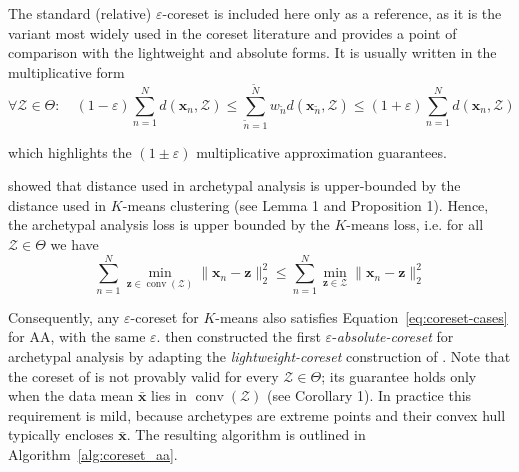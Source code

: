 \documentclass{article}
\begin{document}
The standard (relative) $\varepsilon$-coreset is included here only as a reference, as it is the variant most widely used in the coreset literature and provides a point of comparison with the lightweight and absolute forms.  It is usually written in the multiplicative form
\begin{equation}
    \forall \mathcal{Z} \in \Theta: \quad (1-\varepsilon) \sum_{n=1}^N d(\mathbf{x}_n, \mathcal{Z}) \leq \sum_{\tilde{n}=1}^{\tilde{N}} w_{\tilde{n}} d(\mathbf{x}_{\tilde{n}}, \mathcal{Z}) \leq (1+\varepsilon)  \sum_{n=1}^N d(\mathbf{x}_n, \mathcal{Z})
\end{equation}

which highlights the $(1 \pm \varepsilon)$ multiplicative approximation guarantees.

\textcite{mairCoresetsArchetypalAnalysis2019} showed that distance used in archetypal analysis is upper-bounded by the distance used in $K$-means clustering (see Lemma 1 and Proposition 1). Hence, the archetypal analysis loss is upper bounded by the $K$-means loss, i.e. for all $\mathcal{Z} \in \Theta$ we have
\begin{equation}
    \sum_{n=1}^N \min_{\mathbf{z} \in \operatorname{conv}(\mathcal{Z})} \| \mathbf{x}_n - \mathbf{z} \|_2^2 \leq
    \sum_{n=1}^N \min_{\mathbf{z} \in \mathcal{Z}} \| \mathbf{x}_n - \mathbf{z} \|_2^2
\end{equation}

Consequently, any $\varepsilon$-coreset for $K$-means also satisfies Equation~\ref{eq:coreset-cases} for AA, with the same $\varepsilon$. \textcite{mairCoresetsArchetypalAnalysis2019} then constructed the first $\varepsilon$-\emph{absolute-coreset} for archetypal analysis by adapting the \emph{lightweight-coreset} construction of \textcite{bachemScalableMeansClustering2018}. Note that the coreset of \textcite{mairCoresetsArchetypalAnalysis2019} is not provably valid for every $\mathcal{Z}\in\Theta$; its guarantee holds only when the data mean $\bar{\mathbf{x}}$ lies in $\operatorname{conv}(\mathcal Z)$ (see Corollary 1). In practice this requirement is mild, because archetypes are extreme points and their convex hull typically encloses $\bar{\mathbf{x}}$. The resulting algorithm is outlined in Algorithm~\ref{alg:coreset_aa}.
\end{document}
